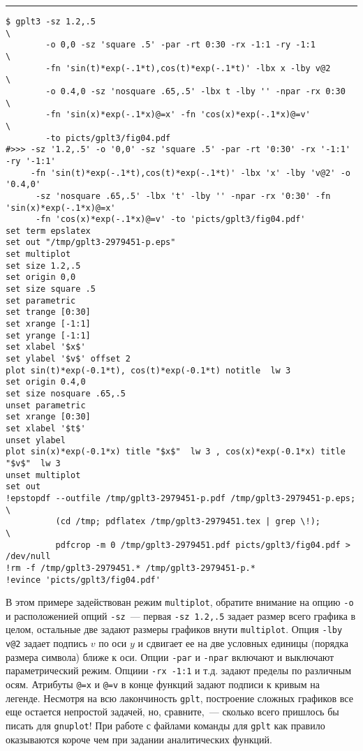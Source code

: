 \documentclass[12pt]{article}
\def\gplt{{\tt gplt}}
\def\gnuplot{{\tt gnuplot}}
\begin{document}
\hrule %

\vspace{3mm}
{\small
\begin{verbatim}
$ gplt3 -sz 1.2,.5                                                              \
        -o 0,0 -sz 'square .5' -par -rt 0:30 -rx -1:1 -ry -1:1                  \
        -fn 'sin(t)*exp(-.1*t),cos(t)*exp(-.1*t)' -lbx x -lby v@2               \
        -o 0.4,0 -sz 'nosquare .65,.5' -lbx t -lby '' -npar -rx 0:30            \
        -fn 'sin(x)*exp(-.1*x)@=x' -fn 'cos(x)*exp(-.1*x)@=v'                   \
        -to picts/gplt3/fig04.pdf 
#>>> -sz '1.2,.5' -o '0,0' -sz 'square .5' -par -rt '0:30' -rx '-1:1' -ry '-1:1' 
     -fn 'sin(t)*exp(-.1*t),cos(t)*exp(-.1*t)' -lbx 'x' -lby 'v@2' -o '0.4,0' 
      -sz 'nosquare .65,.5' -lbx 't' -lby '' -npar -rx '0:30' -fn 'sin(x)*exp(-.1*x)@=x' 
      -fn 'cos(x)*exp(-.1*x)@=v' -to 'picts/gplt3/fig04.pdf'
set term epslatex 
set out "/tmp/gplt3-2979451-p.eps"
set multiplot
set size 1.2,.5
set origin 0,0
set size square .5
set parametric
set trange [0:30]
set xrange [-1:1]
set yrange [-1:1]
set xlabel '$x$'
set ylabel '$v$' offset 2
plot sin(t)*exp(-0.1*t), cos(t)*exp(-0.1*t) notitle  lw 3 
set origin 0.4,0
set size nosquare .65,.5
unset parametric
set xrange [0:30]
set xlabel '$t$'
unset ylabel
plot sin(x)*exp(-0.1*x) title "$x$"  lw 3 , cos(x)*exp(-0.1*x) title "$v$"  lw 3 
unset multiplot
set out
!epstopdf --outfile /tmp/gplt3-2979451-p.pdf /tmp/gplt3-2979451-p.eps;        \
          (cd /tmp; pdflatex /tmp/gplt3-2979451.tex | grep \!);               \
          pdfcrop -m 0 /tmp/gplt3-2979451.pdf picts/gplt3/fig04.pdf > /dev/null
!rm -f /tmp/gplt3-2979451.* /tmp/gplt3-2979451-p.*
!evince 'picts/gplt3/fig04.pdf'\end{verbatim}
  }
\begin{center}
  \epsfig{file=picts/gplt3/fig04}
\end{center}
В этом примере задействован режим \verb'multiplot', обратите внимание на опцию \verb'-o' и расположенией опций \verb'-sz'~---
первая \verb'-sz 1.2,.5' задает размер всего графика в целом, остальные две задают размеры графиков внути \verb'multiplot'.
Опция \verb'-lby v@2' задает подпись $v$ по оси $y$ и сдвигает ее на две условных единицы (порядка размера символа) ближе к оси. Опции \verb'-par' и \verb'-npar'
включают и выключают параметрический режим. Опциии \verb'-rx -1:1' и т.д. задают пределы по различным осям. Атрибуты \verb'@=x' и  \verb'@=v' в конце функций
задают подписи к кривым на легенде.
Несмотря на всю лакончиность \gplt, построение сложных графиков все еще остается непростой задачей, но, сравните,~--- сколько всего пришлось бы писать для \gnuplot!
При работе с файлами команды для \gplt{} как правило оказываются короче чем при задании  аналитических функций.\\
\end{document}
